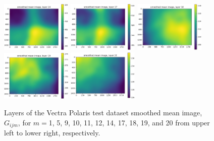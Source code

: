 \documentclass[letterpaper,11pt]{article}
\begin{document}
\begin{figure}[!ht]
\includegraphics[width=0.3\textwidth]{images/results/smoothed_mean_image_layers_polaris/smoothed_mean_image_layer_14}
\includegraphics[width=0.3\textwidth]{images/results/smoothed_mean_image_layers_polaris/smoothed_mean_image_layer_17}
\includegraphics[width=0.3\textwidth]{images/results/smoothed_mean_image_layers_polaris/smoothed_mean_image_layer_18}
\includegraphics[width=0.3\textwidth]{images/results/smoothed_mean_image_layers_polaris/smoothed_mean_image_layer_19}
\includegraphics[width=0.3\textwidth]{images/results/smoothed_mean_image_layers_polaris/smoothed_mean_image_layer_20}
\caption{\footnotesize Layers of the Vectra Polaris test dataset smoothed mean image, $G_{ijm}$, for $m=$1, 5, 9, 10, 11, 12, 14, 17, 18, 19, and 20 from upper left to lower right, respectively.}
\label{fig:uncorrected_mean_image_layers_polaris_1}
\end{figure}
\end{document}
